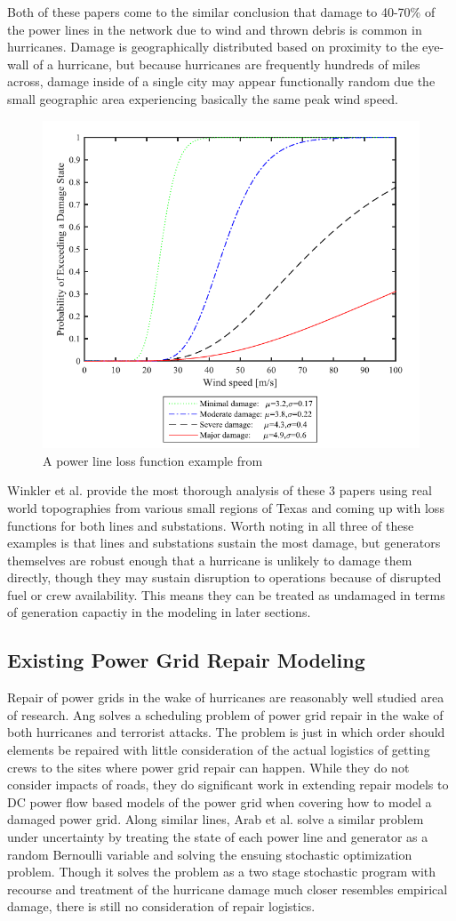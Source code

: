 \documentclass{article}
\begin{document}
		 Both of these papers come to the similar conclusion that damage to 40-70\% of the power lines in the network due to wind and thrown debris is common in hurricanes. Damage is geographically distributed based on proximity to the eye-wall of a hurricane, but because hurricanes are frequently hundreds of miles across, damage inside of a single city may appear functionally random due the small geographic area experiencing basically the same peak wind speed. 
		
			\begin{figure}[htbp]
			\centering
			\includegraphics[width=.5\linewidth]{ScherbFigure.PNG}
			\caption{A power line loss function example from \cite{ScherbEA2015}}
		\end{figure}
		
		 Winkler et al. \cite{WinklerEA2010} provide the most thorough analysis of these 3 papers using real world topographies from various small regions of Texas and coming up with loss functions for both lines and substations. Worth noting in all three of these examples is that lines and substations sustain the most damage, but generators themselves are robust enough that a hurricane is unlikely to damage them directly, though they may sustain disruption to operations because of disrupted fuel or crew availability. This means they can be treated as undamaged in terms of generation capactiy in the modeling in later sections. 
	\subsection{Existing Power Grid Repair Modeling}
	Repair of power grids in the wake of hurricanes are reasonably well studied area of research. Ang \cite{NPSMasters} solves a scheduling problem of power grid repair in the wake of both hurricanes and terrorist attacks. The problem is just in which order should elements be repaired with little consideration of the actual logistics of getting crews to the sites where power grid repair can happen. While they do not consider impacts of roads, they do significant work in extending repair models to DC power flow based models of the power grid when covering how to model a damaged power grid. Along similar lines, Arab et al. \cite{ArabEA2015} solve a similar problem under uncertainty by treating the state of each power line and generator as a random Bernoulli variable and solving the ensuing stochastic optimization problem. Though it solves the problem as a two stage stochastic program with recourse and treatment of the hurricane damage much closer resembles empirical damage, there is still no consideration of repair logistics. 
		
\end{document}

